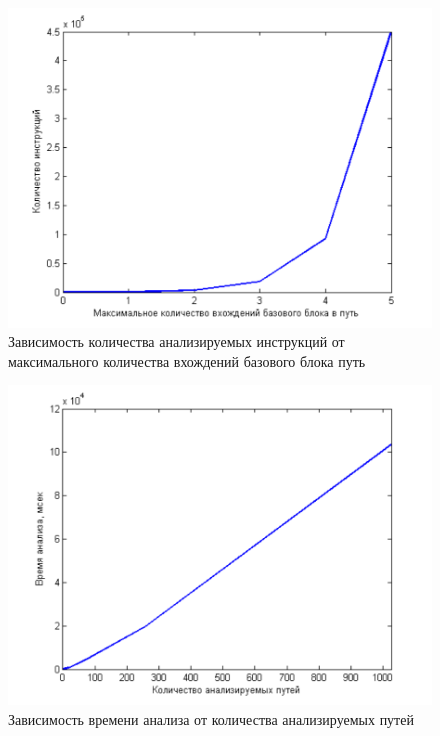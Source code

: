 \begin{figure}
  \centering
  \includegraphics[width=\textwidth]{inc/png/graphic2}
  \caption{Зависимость количества анализируемых инструкций от максимального количества вхождений базового блока путь}
  \label{fig:graphic2}
\end{figure}

\begin{figure}
  \centering
  \includegraphics[width=\textwidth]{inc/png/graphic3}
  \caption{Зависимость времени анализа от количества анализируемых путей}
  \label{fig:graphic3}
\end{figure}

